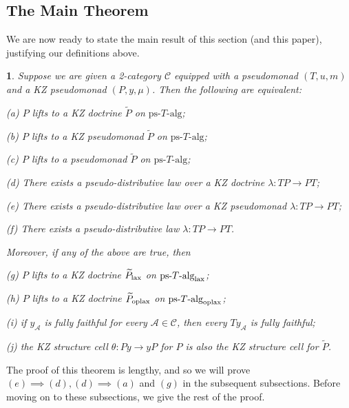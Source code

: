 \documentclass[a4paper,oneside,english]{amsart}
\numberwithin{equation}{section}
\numberwithin{figure}{section}
\theoremstyle{plain}
\newtheorem{thm}{\protect\theoremname}
\theoremstyle{definition}
\theoremstyle{remark}
\theoremstyle{definition}
\theoremstyle{plain}
\theoremstyle{plain}
\theoremstyle{plain}
\providecommand{\theoremname}{Theorem}
\begin{document}
\subsection{The Main Theorem}

We are now ready to state the main result of this section (and this
paper), justifying our definitions above.
\begin{thm}
\label{liftkzequiv} Suppose we are given a 2-category $\mathscr{C}$
equipped with a pseudomonad $\left(T,u,m\right)$ and a KZ pseudomonad
$\left(P,y,\mu\right)$. Then the following are equivalent:

(a) $P$ lifts to a KZ doctrine $\widetilde{P}$ on $\text{ps-}T\text{-alg}$;

(b) $P$ lifts to a KZ pseudomonad $\widetilde{P}$ on $\text{ps-}T\text{-alg}$;

(c) $P$ lifts to a pseudomonad $\widetilde{P}$ on $\text{ps-}T\text{-alg}$;

(d) There exists a pseudo-distributive law over a KZ doctrine $\lambda\colon TP\to PT$;

(e) There exists a pseudo-distributive law over a KZ pseudomonad $\lambda\colon TP\to PT$;

(f) There exists a pseudo-distributive law $\lambda\colon TP\to PT$.

\noindent Moreover, if any of the above are true, then 

(g) $P$ lifts to a KZ doctrine $\widetilde{P}_{\textnormal{lax}}$
on $\text{ps-}T\text{-alg}_{\textnormal{lax}}$;

(h) $P$ lifts to a KZ doctrine $\widetilde{P}_{\textnormal{oplax}}$
on $\text{ps-}T\text{-alg}_{\textnormal{oplax}}$;

(i) if $y_{\mathcal{A}}$ is fully faithful for every $\mathcal{A}\in\mathscr{C}$,
then every $Ty_{\mathcal{A}}$ is fully faithful;

(j) the KZ structure cell $\theta\colon Py\to yP$ for $P$ is also
the KZ structure cell for $\widetilde{P}$.
\end{thm}
The proof of this theorem is lengthy, and so we will prove $\left(e\right)\implies\left(d\right),\left(d\right)\implies\left(a\right)$
and $\left(g\right)$ in the subsequent subsections. Before moving
on to these subsections, we give the rest of the proof.
\end{document}

